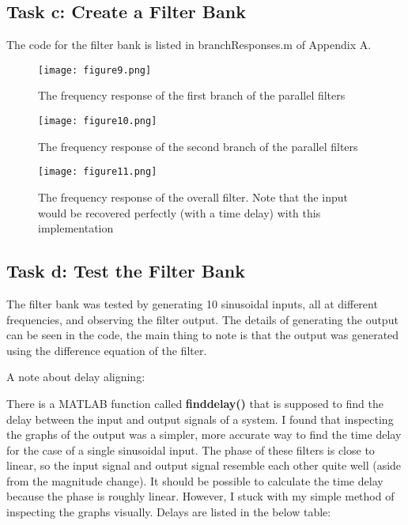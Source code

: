 \documentclass[12pt]{scrartcl} %
\begin{document}
		\subsection{Task c: Create a Filter Bank}
		
		The code for the filter bank is listed in branchResponses.m of Appendix A.
	
		
		\begin{figure}[H]
			\centering
			\texttt{[image: figure9.png]}
			\caption{The frequency response of the first branch of the parallel filters}
			\end{figure}
		
		\begin{figure}[H]
			\centering
			\texttt{[image: figure10.png]}
			\caption{The frequency response of the second branch of the parallel filters}
		\end{figure}
	
			\begin{figure}[H]
		\centering
		\texttt{[image: figure11.png]}
		\caption{The frequency response of the overall filter. Note that the input would be recovered perfectly (with a time delay) with this implementation}
	\end{figure}
	
		
		\subsection{Task d: Test the Filter Bank}
		
			The filter bank was tested by generating 10 sinusoidal inputs, all at different frequencies, and observing the filter output. The details of generating the output can be seen in the code, the main thing to note is that the output was generated using the difference equation of the filter.
		
			\vspace{5mm}
			
			A note about delay aligning:
			
				\vspace{5mm}
				
			There is a MATLAB function called \textbf{finddelay()} that is supposed to find the delay between the input and output signals of a system. I found that inspecting the graphs of the output was a simpler, more accurate way to find the time delay for the case of a single sinusoidal input. The phase of these filters is close to linear, so the input signal and output signal resemble each other quite well (aside from the magnitude change). It should be possible to calculate the time delay because the phase is roughly linear. However, I stuck with my simple method of inspecting the graphs visually. Delays are listed in the below table:
			
\end{document}
